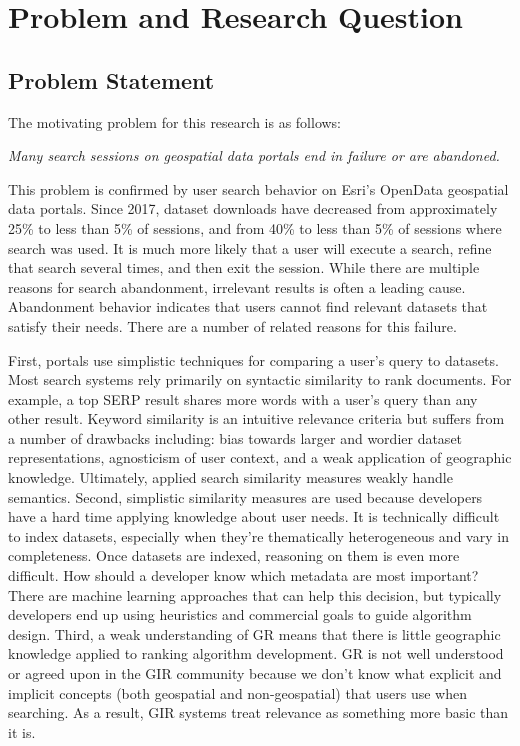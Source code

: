 \chapter{Problem and Research Question} \label{ch:[chapter 3 label]}

\section{Problem Statement}

The motivating problem for this research is as follows:
\linebreak

\emph{Many search sessions on geospatial data portals end in failure or are abandoned.}
\linebreak

This problem is confirmed by user search behavior on Esri's OpenData geospatial data portals. Since 2017, dataset downloads have decreased from approximately 25\% to less than 5\% of sessions, and from 40\% to less than 5\% of sessions where search was used. It is much more likely that a user will execute a search, refine that search several times, and then exit the session. While there are multiple reasons for search abandonment, irrelevant results is often a leading cause. Abandonment behavior indicates that users cannot find relevant datasets that satisfy their needs. There are a number of related reasons for this failure.

First, portals use simplistic techniques for comparing a user's query to datasets. Most search systems rely primarily on syntactic similarity to rank documents. For example, a top SERP result shares more words with a user's query than any other result. Keyword similarity is an intuitive relevance criteria but suffers from a number of drawbacks including: bias towards larger and wordier dataset representations, agnosticism of user context, and a weak application of geographic knowledge. Ultimately, applied search similarity measures weakly handle semantics. Second, simplistic similarity measures are used because developers have a hard time applying knowledge about user needs. It is technically difficult to index datasets, especially when they're thematically heterogeneous and vary in completeness. Once datasets are indexed, reasoning on them is even more difficult. How should a developer know which metadata are most important? There are machine learning approaches that can help this decision, but typically developers end up using heuristics and commercial goals to guide algorithm design. Third, a weak understanding of GR means that there is little geographic knowledge applied to ranking algorithm development. GR is not well understood or agreed upon in the GIR community \cite{Purves2018} because we don't know what explicit and implicit concepts (both geospatial and non-geospatial) that users use when searching. As a result, GIR systems treat relevance as something more basic than it is.

